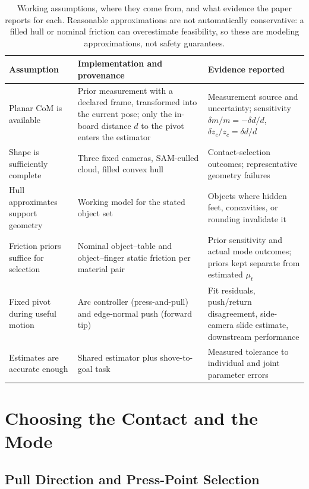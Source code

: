\documentclass[10pt, conference]{IEEEtran}
\begin{document}
\begin{table}[t]
  \centering
  \caption{Working assumptions, where they come from, and what evidence the paper reports for each. Reasonable approximations are not automatically conservative: a filled hull or nominal friction can overestimate feasibility, so these are modeling approximations, not safety guarantees.}
  \label{tab:assumptions}
  \small
  \begin{tabular}{p{} p{} p{}}
    \toprule
    \textbf{Assumption} & \textbf{Implementation and provenance} & \textbf{Evidence reported} \\
    \midrule
    Planar CoM is available & Prior measurement with a declared frame, transformed into the current pose; only the in-board distance $d$ to the pivot enters the estimator & Measurement source and uncertainty; sensitivity $\delta m/m = -\delta d/d$, $\delta z_c/z_c = \delta d/d$ \\
    Shape is sufficiently complete & Three fixed cameras, SAM-culled cloud, filled convex hull & Contact-selection outcomes; representative geometry failures \\
    Hull approximates support geometry & Working model for the stated object set & Objects where hidden feet, concavities, or rounding invalidate it \\
    Friction priors suffice for selection & Nominal object--table and object--finger static friction per material pair & Prior sensitivity and actual mode outcomes; priors kept separate from estimated $\mu_t$ \\
    Fixed pivot during useful motion & Arc controller (press-and-pull) and edge-normal push (forward tip) & Fit residuals, push/return disagreement, side-camera slide estimate, downstream performance \\
    Estimates are accurate enough & Shared estimator plus shove-to-goal task & Measured tolerance to individual and joint parameter errors \\
    \bottomrule
  \end{tabular}
\end{table}

\section{Choosing the Contact and the Mode} \label{sec:contact_mode}
\subsection{Pull Direction and Press-Point Selection}
\label{sec:press_point_selection}
\end{document}
